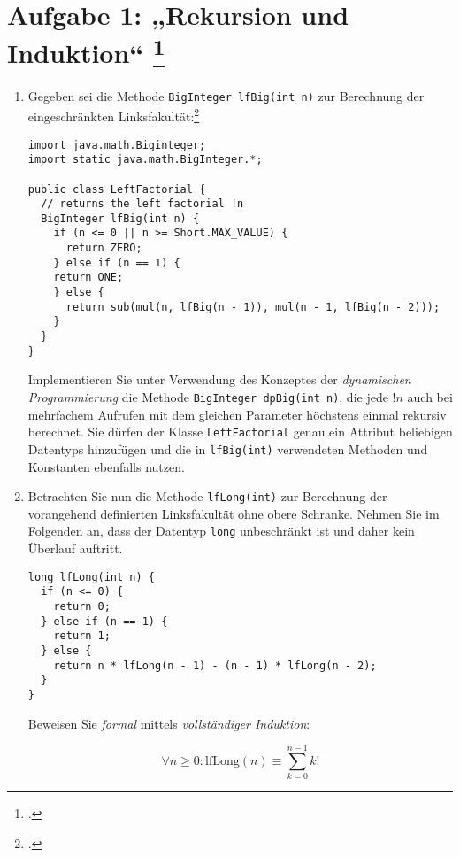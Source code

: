 \documentclass{lehramt-informatik-aufgabe}
\begin{document}
\section{Aufgabe 1: „Rekursion und Induktion“
\footcite[Thema 1 Aufgabe 1b Seite 2-3]{examen:66115:2014:03}}

\begin{enumerate}
\item Gegeben sei die Methode \verb|BigInteger lfBig(int n)| zur
Berechnung der eingeschränkten Linksfakultät:\footcite[Seite 25]{aud:fs:1}

\begin{verbatim}
import java.math.Biginteger;
import static java.math.BigInteger.*;

public class LeftFactorial {
  // returns the left factorial !n
  BigInteger lfBig(int n) {
    if (n <= 0 || n >= Short.MAX_VALUE) {
      return ZERO;
    } else if (n == 1) {
    return ONE;
    } else {
      return sub(mul(n, lfBig(n - 1)), mul(n - 1, lfBig(n - 2)));
    }
  }
}
\end{verbatim}

Implementieren Sie unter Verwendung des Konzeptes der \emph{dynamischen
Programmierung} die Methode \verb|BigInteger dpBig(int n)|, die jede
$!n$
auch bei mehrfachem Aufrufen mit dem gleichen Parameter höchstens einmal
rekursiv berechnet. Sie dürfen der Klasse \verb|LeftFactorial| genau ein
Attribut beliebigen Datentyps hinzufügen und die in \verb|lfBig(int)|
verwendeten Methoden und Konstanten ebenfalls nutzen.

\item Betrachten Sie nun die Methode \verb|lfLong(int)| zur Berechnung
der vorangehend definierten Linksfakultät ohne obere Schranke. Nehmen
Sie im Folgenden an, dass der Datentyp \verb|long| unbeschränkt ist und
daher kein Überlauf auftritt.

\begin{verbatim}
long lfLong(int n) {
  if (n <= 0) {
    return 0;
  } else if (n == 1) {
    return 1;
  } else {
    return n * lfLong(n - 1) - (n - 1) * lfLong(n - 2);
  }
}
\end{verbatim}

Beweisen Sie \emph{formal} mittels \emph{vollständiger Induktion}:

\def\lf#1{\text{lfLong}(#1)}
\def\sk#1{\sum^{#1}_{k=0}k!}

\begin{displaymath}
\forall n \geq 0: \lf{n} \equiv \sk{n-1}
\end{displaymath}


\end{enumerate}
\end{document}
